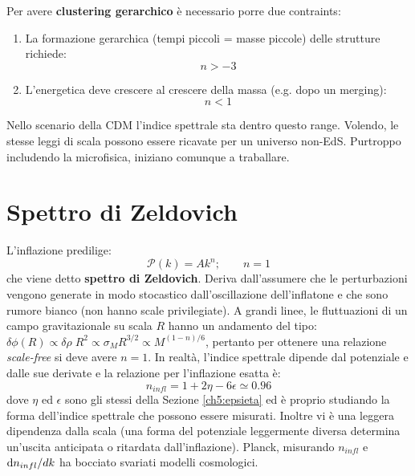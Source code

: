 \vspace{1em}
\noindent Per avere \textbf{clustering gerarchico} è necessario porre due contraints:
\begin{enumerate}
    \item La formazione gerarchica (tempi piccoli = masse piccole) delle strutture richiede: $$n>-3$$
    \item L'energetica deve crescere al crescere della massa (e.g. dopo un merging): $$n<1$$
\end{enumerate}

Nello scenario della CDM l'indice spettrale sta dentro questo range. Volendo, le stesse leggi di scala possono essere ricavate per un universo non-EdS. Purtroppo includendo la microfisica, iniziano comunque a traballare.

\section{Spettro di Zeldovich}
L'inflazione predilige:
$$
\mathcal{P}(k) = Ak^n; \qquad n=1
$$
che viene detto \textbf{spettro di Zeldovich}. Deriva dall'assumere che le perturbazioni vengono generate in modo stocastico dall'oscillazione dell'inflatone e che sono rumore bianco (non hanno scale privilegiate).  A grandi linee, le fluttuazioni di un campo gravitazionale su scala $R$ hanno un andamento del tipo: $\delta \phi (R) \propto \delta \rho \; R^2 \propto \sigma_M R^{3/2} \propto M^{(1-n)/6}$, pertanto per ottenere una relazione \textit{scale-free} si deve avere $n=1$. In realtà, l'indice spettrale dipende dal potenziale e dalle sue derivate e la relazione per l'inflazione esatta è:
\begin{equation}
    n_{infl}=1+2\eta -6\epsilon \simeq 0.96
\end{equation}
dove $\eta$ ed $\epsilon$ sono gli stessi della Sezione \ref{ch5:epsieta} ed è proprio studiando la forma dell'indice spettrale che possono essere misurati. Inoltre vi è una leggera dipendenza dalla scala (una forma del potenziale leggermente diversa determina un'uscita anticipata o ritardata dall'inflazione). Planck, misurando $n_{infl}$ e $\operatorname{d}\!{n_{infl}}/d{k}$ ha bocciato svariati modelli cosmologici.

